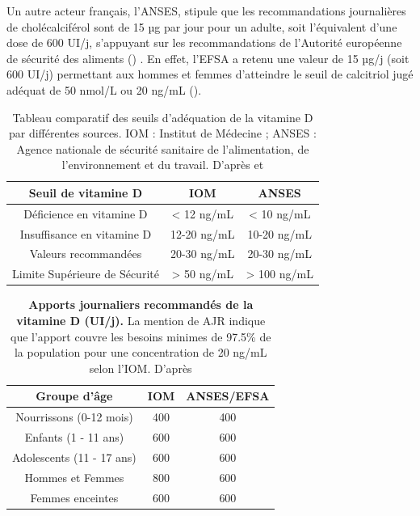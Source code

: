 \documentclass[
  a4paper,
  DIV=11,
  numbers=noendperiod,
  listof=totoc]{scrreprt}
\begin{document}
Un autre acteur français, l'\ac{ANSES}, stipule que les recommandations
journalières de cholécalciférol sont de 15 µg par jour pour un adulte,
soit l'équivalent d'une dose de 600 UI/j, s'appuyant sur les
recommandations de l'Autorité européenne de sécurité des aliments
() \autocite{ANSES.2021}. En effet, l'\ac{EFSA} a retenu une
valeur de 15 µg/j (soit 600 UI/j) permettant aux hommes et femmes
d'atteindre le seuil de calcitriol jugé adéquat de 50 nmol/L ou 20 ng/mL
\autocite{ANSES.2022.note} ().

\begin{table}
\caption[Tableau comparatif des seuils d'adéquation de la vitamine D par différentes sources.]{Tableau comparatif des seuils d'adéquation de la vitamine D par différentes sources. IOM : Institut de Médecine ; ANSES : Agence nationale de sécurité sanitaire de l’alimentation, de l’environnement et du travail. D'après \textcite{IOM.2011} et \textcite{ANSES.2021}}
\label{tbl-seuil}
\centering
\begin{tabular}{ccc}
\toprule
\textbf{Seuil de vitamine D} & \textbf{IOM} & \textbf{ANSES}\\
\midrule
Déficience en vitamine D & < 12 ng/mL & < 10 ng/mL\\
Insuffisance en vitamine D & 12-20 ng/mL & 10-20 ng/mL\\
Valeurs recommandées & 20-30 ng/mL & 20-30 ng/mL\\
Limite Supérieure de Sécurité & > 50 ng/mL  & > 100 ng/mL \\
\bottomrule
\end{tabular}
\end{table}

\begin{table}
\centering
\caption[{Apports journaliers recommandés de la vitamine D (UI/j)}]{\textbf{Apports journaliers recommandés de la vitamine D (UI/j).} La mention de \ac{AJR} indique que l'apport couvre les besoins minimes de 97.5\% de la population pour une concentration de 20 ng/mL selon l'\ac{IOM}. D'après \textcite{ANSES.2021, IOM.2011}}
\label{tbl-AJR}
\begin{tabular}{ccc}
\toprule
\textbf{Groupe d'âge} & \textbf{IOM} & \textbf{ANSES/EFSA} \\
\midrule
Nourrissons (0-12 mois) & 400 & 400 \\
Enfants (1 - 11 ans) & 600 & 600 \\
Adolescents (11 - 17 ans) & 600 & 600 \\
Hommes et Femmes & 800 & 600 \\
Femmes enceintes & 600 & 600 \\
\bottomrule
\end{tabular}
\end{table}
\end{document}
